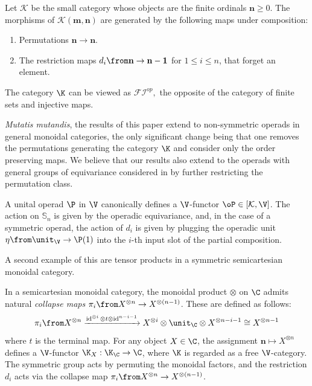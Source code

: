 \documentclass{tac}
\def\id{\operatorname{id}}
\begin{document}
\begin{definition}
\label{def:K}
Let $\mathcal{K}$ be the small category whose objects are the finite ordinals $\mathbf{n} \ge 0$. The morphisms of $\mathcal{K}(\mathbf{m}, \mathbf{n})$ are generated by the following maps under composition:
\begin{enumerate}
    \item Permutations $\mathbf{n} \to \mathbf{n}.$
    \item The restriction maps $d_i\from \mathbf{n} \to \mathbf{n-1}$ for $1 \le i \le n$, that forget an element.
\end{enumerate}
\end{definition}
The category $\K$ can be viewed as $\mathcal{FI}^{op},$ the opposite of the category of finite sets and injective maps.
\begin{remark}
   \emph{Mutatis mutandis}, the results of this paper extend to non-symmetric operads in general monoidal categories, the only significant change being that one removes the permutations generating the category $\K$ and consider only the order preserving maps. We believe that our results also extend to the  operads with general groups of equivariance considered in \cite{corner14} by further restricting the permutation class.
\end{remark}
\begin{example}
A unital operad $\P$ in $\V$ canonically defines a $\V$-functor $\oP \in  [\mathcal{K},\V]$. The action on $\mathbb{S}_n$ is given by the operadic equivariance, and, in the case of a symmetric operad, the action of $d_i$ is given by plugging the operadic unit $\eta\from \unit_{\V} \to \P(1)$ into the $i$-th input slot of the partial composition. 
\end{example}
A second example of this are tensor products in a symmetric semicartesian monoidal category.
\begin{example}
In a semicartesian monoidal category, the monoidal product $\otimes$ on $\C$ admits natural \emph{collapse maps} $\pi_i\from X^{\otimes n} \to X^{\otimes (n-1)}$. These are defined as follows:
$$
\pi_i\from X^{\otimes n} \xrightarrow{\id^{\otimes i}\otimes t \otimes \id^{n-i-1}} X^{\otimes i} \otimes \unit_{\C} \otimes X^{\otimes n-i-1} \cong X^{\otimes n-1}
$$
where $t$ is the terminal map.
For any object $X \in \C$, the assignment $\mathbf{n} \mapsto X^{\otimes n}$ defines a $\V$-functor $\K_X: \K_{\C} \to \C$, where $\K$ is regarded as a free $\V$-category. The symmetric group acts by permuting the monoidal factors, and the restriction $d_i$ acts via the collapse map $\pi_i\from X^{\otimes n} \to X^{\otimes (n-1)}$.
\end{example}
\end{document}
